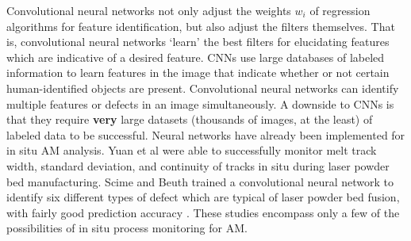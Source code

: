 Convolutional neural networks not only adjust the weights $w_i$ of regression algorithms for feature identification, but also adjust the filters themselves. That is, convolutional neural networks `learn' the best filters for elucidating features which are indicative of a desired feature.  CNNs use large databases of labeled information to learn features in the image that indicate whether or not certain human-identified objects are present. Convolutional neural networks can identify multiple features or defects in an image simultaneously. A downside to CNNs is that they require \textbf{very} large datasets (thousands of images, at the least) of labeled data to be successful. Neural networks have already been implemented for in situ AM analysis. Yuan et al \cite{Yuan2018} were able to successfully monitor melt track width, standard deviation, and continuity of tracks in situ during laser powder bed manufacturing. Scime and Beuth trained a convolutional neural network to identify six different types of defect which are typical of laser powder bed fusion, with fairly good prediction accuracy \cite{Scime2018}. These studies encompass only a few of the possibilities of in situ process monitoring for AM. 



